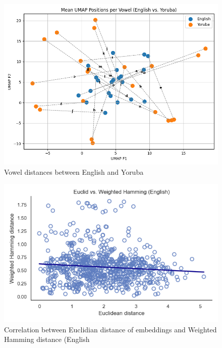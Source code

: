 \documentclass[11pt]{article}
\begin{document}
{\begin{figure}
    \centering
    \includegraphics[width=1\linewidth]{yoruba_eng_plot.png}
    \caption{Vowel distances between English and Yoruba}
    \label{fig:placeholder}
\end{figure}

\begin{figure}
    \centering
    \includegraphics[width=1\linewidth]{engcor.png}
    \caption{Correlation between Euclidian distance of embeddings and Weighted Hamming distance (English}
    \label{fig:placeholder}
\end{figure}

}
\end{document}
